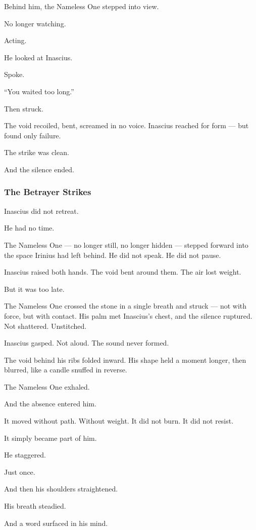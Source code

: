 \documentclass[12pt]{article}
\begin{document}
Behind him, the Nameless One stepped into view.

No longer watching.

Acting.

He looked at Inascius.

Spoke.

``You waited too long.''

Then struck.

The void recoiled, bent, screamed in no voice. Inascius reached for form — but found only failure.

The strike was clean.

And the silence ended.


\dotfill

\subsubsection{The Betrayer Strikes}

Inascius did not retreat.

He had no time.

The Nameless One — no longer still, no longer hidden — stepped forward into the space Irinius had left behind. He did not speak. He did not pause.

Inascius raised both hands. The void bent around them. The air lost weight.

But it was too late.

The Nameless One crossed the stone in a single breath and struck — not with force, but with contact. His palm met Inascius’s chest, and the silence ruptured. Not shattered. Unstitched.

Inascius gasped. Not aloud. The sound never formed.

The void behind his ribs folded inward. His shape held a moment longer, then blurred, like a candle snuffed in reverse.

The Nameless One exhaled.

And the absence entered him.

It moved without path. Without weight. It did not burn. It did not resist.

It simply became part of him.

He staggered.

Just once.

And then his shoulders straightened.

His breath steadied.

And a word surfaced in his mind.
\end{document}
